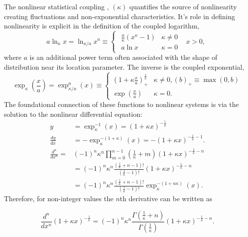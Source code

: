 \documentclass[twoside,11pt]{article}
\begin{document}
The nonlinear statistical coupling \citep{nelsonNonlinearStatisticalCoupling2010}, $(\kappa)$ quantifies the source of nonlinearity creating fluctuations and non-exponential characteristics. It's role in defining nonlinearity is explicit in the definition of the coupled logarithm,
\begin{equation} \label{coupledLog}
    a\ln_\kappa x=\ln_{\kappa/a} x^a\equiv
    \left\{\begin{matrix}\begin{matrix}
        \frac{a}{\kappa}\left(x^{\kappa}-1\right) & \kappa \neq 0 \\
        a\ln x & \kappa=0
    \end{matrix}
    & x>0,
    \end{matrix}\right.
\end{equation}
where $a$ is an additional power term often associated with the shape of distribution near its location parameter. The inverse is the coupled exponential, 
\begin{equation}
    \exp_{\kappa}\left(\frac{x}{a}\right) = 
    \exp_{\kappa/a}^a(x)
    \equiv\left\{ \begin{matrix}
     (1+\kappa \frac{x}{a})_+^\frac{1}{\kappa} & 
     \kappa \neq 0, (b)_+ \equiv \max(0,b) \\
     \exp\left(\frac{x}{a}\right) &
     \kappa=0.
    \end{matrix}\right.
\end{equation}
The foundational connection of these functions to nonlinear systems is via the solution to the nonlinear differential equation:
\begin{align}
y &=  \exp_\kappa^{-1}(x)
= (1+\kappa x)^{-\frac{1}{\kappa}}\\
\frac{dy}{dx}&= -\exp_\kappa^{-(1+\kappa)}(x)=
-\left(1+\kappa x\right)^{-\frac{1}{\kappa}-1}.\\
\frac{d^n}{dx^n}=&(-1)^n\kappa^n\prod_{m=0}^{n-1}\left(\frac{1}{\kappa}+m\right)(1+\kappa x)^{-\frac{1}{\kappa}-n}\\
&= (-1)^n\kappa^n\frac{\left(\frac{1}{\kappa}+n-1\right)!}{\left(\frac{1}{\kappa}-1\right)!}(1+\kappa x)^{-\frac{1}{\kappa}-n}\\
&= (-1)^n\kappa^n\frac{\left(\frac{1}{\kappa}+n-1\right)!}{\left(\frac{1}{\kappa}-1\right)!}\exp_\kappa^{-(1+n\kappa)}(x).
\end{align}
Therefore, for non-integer values the $n$th derivative can be written as

\[
\frac{d^n}{dx^n}(1+\kappa x)^{-\frac{1}{\kappa}}
=(-1)^n\kappa^n\frac{\Gamma\!\left(\frac{1}{\kappa}+n\right)}{\Gamma\!\left(\frac{1}{\kappa}\right)}(1+\kappa x)^{-\frac{1}{\kappa}-n}.
\]
\end{document}
